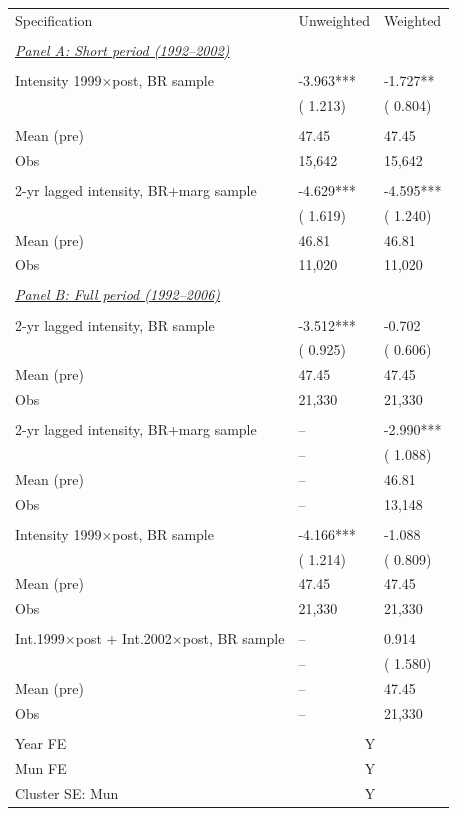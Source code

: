 \begin{tabular}{p{5.5cm}p{2.8cm}p{2.8cm}} \hline \hline
Specification & Unweighted & Weighted \\ 
 & & \\ \toprule
\underline{\textit{Panel A: Short period (1992--2002)}} \\ 
  & & \\ 
Intensity 1999$\times$post, BR sample &       -3.963*** &       -1.727** \\ 
 & (       1.213) & (       0.804) \\ 
  & & \\ 
Mean (pre) &        47.45 &        47.45 \\ 
Obs &       15,642 &       15,642 \\ 
  & & \\ 
2-yr lagged intensity, BR+marg sample &       -4.629*** &       -4.595*** \\ 
 & (       1.619) & (       1.240) \\ 
Mean (pre) &        46.81 &        46.81 \\ 
Obs &       11,020 &       11,020 \\ 
  & & \\ 
\underline{\textit{Panel B: Full period (1992--2006)}} \\ 
  & & \\ 
2-yr lagged intensity, BR sample &       -3.512*** &       -0.702 \\ 
& (       0.925) & (       0.606) \\ 
Mean (pre) &        47.45 &        47.45 \\ 
Obs &       21,330 &       21,330 \\ 
  & & \\ 
2-yr lagged intensity, BR+marg sample & -- &       -2.990*** \\ 
 & -- & (       1.088) \\ 
Mean (pre) & -- &        46.81 \\ 
Obs & -- &       13,148 \\ 
  & & \\ 
Intensity 1999$\times$post, BR sample &       -4.166*** &       -1.088 \\ 
& (       1.214) & (       0.809) \\ 
Mean (pre) &        47.45 &        47.45 \\ 
Obs &       21,330 &       21,330 \\ 
  & & \\ 
Int.1999$\times$post + Int.2002$\times$post, BR sample & -- &        0.914 \\ 
 & -- & (       1.580) \\ 
Mean (pre) & -- &        47.45 \\ 
Obs & -- &       21,330 \\ 
  & & \\ 
Year FE & \multicolumn{2}{c}{Y} \\ 
Mun FE & \multicolumn{2}{c}{Y} \\ 
Cluster SE: Mun & \multicolumn{2}{c}{Y} \\ 
\bottomrule
\end{tabular}